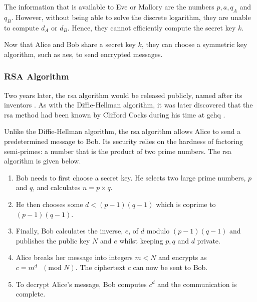The information that is available to Eve or Mallory are the numbers $p, a, q_{A}$ and $q_{B}$. However, without being able to solve the discrete logarithm, they are unable to compute $d_A$ or $d_B$. Hence, they cannot efficiently compute the secret key $k$.  

Now that Alice and Bob share a secret key $k$, they can choose a symmetric key algorithm, such as \ac{aes}, to send encrypted messages.



\subsubsection*{RSA Algorithm}

Two years later, the \ac{rsa} algorithm would be released publicly, named after its inventors \cite{rivest1978method}. As with the Diffie-Hellman algorithm, it was later discovered that the \ac{rsa} method had been known by Clifford Cocks during his time at \ac{gchq} \cite{Cocks1973}. 

Unlike the Diffie-Hellman algorithm, the \ac{rsa} algorithm allows Alice to send a predetermined message to Bob. Its security relies on the hardness of factoring semi-primes: a number that is the product of two prime numbers. The \ac{rsa} algorithm is given below.


\begin{algorithm}
\begin{enumerate}
	\item Bob needs to first choose a secret key. He selects two large prime numbers, $p$ and $q$, and calculates $n = p \times q$.
	\item He then chooses some $d < (p-1)(q-1)$ which is coprime to $(p-1)(q-1)$.
	\item Finally, Bob calculates the inverse, $e$, of $d$ modulo $(p-1)(q-1)$ and publishes the public key $N$ and $e$ whilst keeping $p,q$ and $d$ private.
	\item Alice breaks her message into integers $m < N$ and encrypts as $c = m^d\text{ }(\text{mod }N)$. The ciphertext $c$ can now be sent to Bob.
	\item To decrypt Alice's message, Bob computes $c^d$ and the communication is complete. 
\end{enumerate}   
\end{algorithm}

